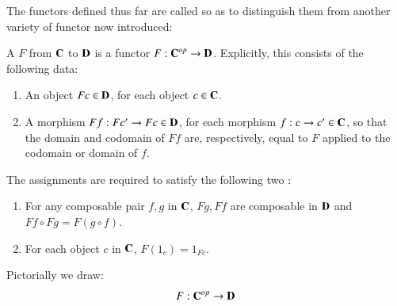\documentclass[12pt, a4paper, oneside, openright, titlepage]{book}
\begin{document}
The functors defined thus far are called  so as to distinguish them from another variety of functor now introduced: 

\begin{defn}
    A  $F$ from $\normalfont\textbf{C}$ to $\normalfont\textbf{D}$ is a functor $F:\normalfont\textbf{C}^{op}\rightarrow \normalfont\textbf{D}$. Explicitly, this consists of the following data: \begin{enumerate}
        \item An object $Fc \in \normalfont\textbf{D}$, for each object $c \in \normalfont\textbf{C}$.
        \item A morphism $Ff:Fc'\rightarrow Fc\in \normalfont\textbf{D}$, for each morphism $f:c\rightarrow c' \in \normalfont\textbf{C}$, so that the domain and codomain of $Ff$ are, respectively, equal to $F$ applied to the codomain or domain of $f$.
    \end{enumerate}
    The assignments are required to satisfy the following two : \begin{enumerate}
        \item For any composable pair $f,g$ in $\normalfont\textbf{C}$, $Fg,Ff$ are composable in $\normalfont\textbf{D}$ and $Ff\circ Fg = F(g\circ f)$.
        \item For each object $c$ in $\normalfont\textbf{C}$, $F(1_c) = 1_{Fc}$.
    \end{enumerate}
    Pictorially we draw:
    \begin{equation*}
        F:\normalfont\textbf{C}^{op}\rightarrow \normalfont\textbf{D}
    \end{equation*}
    \begin{center}
    \end{center}
\end{defn}
\end{document}
